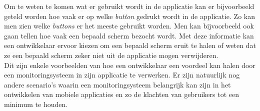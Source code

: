 Om te weten te komen wat er gebruikt wordt in de applicatie kan er bijvoorbeeld geteld worden hoe vaak er op welke \textit{button} gedrukt wordt in de applicatie. Zo kan men zien welke \textit{buttons} er het meeste gebruikt worden. Men kan bijvoorbeeld ook gaan tellen hoe vaak een bepaald scherm bezocht wordt. Met deze informatie kan een ontwikkelaar ervoor kiezen om een bepaald scherm eruit te halen of weten dat ze een bepaald scherm zeker niet uit de applicatie mogen verwijderen. \\


Dit zijn enkele voorbeelden van hoe een ontwikkelaar een voordeel kan halen door een monitoringsysteem in zijn applicatie te verwerken. Er zijn natuurlijk nog andere scenario's waarin een monitoringsysteem belangrijk kan zijn in het ontwikkelen van mobiele applicaties en zo de klachten van gebruikers tot een minimum te houden.